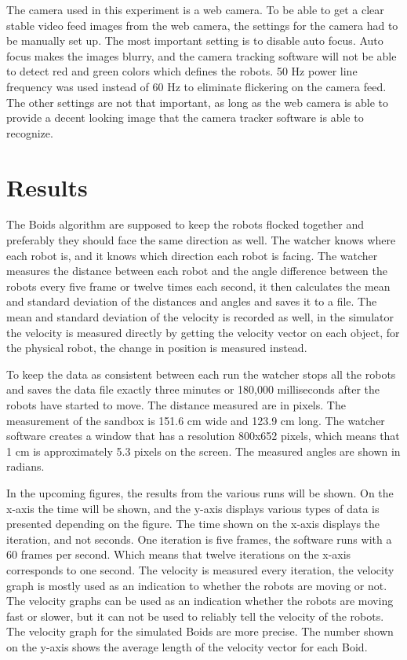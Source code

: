 The camera used in this experiment is a web camera. To be able to get a clear stable video feed images from the web camera, the settings for the camera had to be manually set up.
The most important setting is to disable auto focus. Auto focus makes the images blurry, and the camera tracking software will not be able to detect red and green colors which defines the robots. 50 Hz power line frequency was used instead of 60 Hz to eliminate flickering on the camera feed. The other settings are not that important, as long as the web camera is able to provide a decent looking image that the camera tracker software is able to recognize. 



\section{Results}
\label{sec:results}

The Boids algorithm are supposed to keep the robots flocked together and preferably they should face the same direction as well. The watcher knows where each robot is, and it knows which direction each robot is facing. The watcher measures the distance between each robot and the angle difference between the robots every five frame or twelve times each second, it then calculates the mean and standard deviation of the distances and angles and saves it to a file. The mean and standard deviation of the velocity is recorded as well, in the simulator the velocity is measured directly by getting the velocity vector on each object, for the physical robot, the change in position is measured instead.

To keep the data as consistent between each run the watcher stops all the robots and saves the data file exactly three minutes or 180,000 milliseconds after the robots have started to move.
The distance measured are in pixels. The measurement of the sandbox is 151.6 cm wide and 123.9 cm long. The watcher software creates a window that has a resolution 800x652 pixels, which means that 1 cm is approximately 5.3 pixels on the screen. The measured angles are shown in radians.

In the upcoming figures, the results from the various runs will be shown. On the x-axis the time will be shown, and the y-axis displays various types of data is presented depending on the figure. The time shown on the x-axis displays the iteration, and not seconds. One iteration is five frames, the software runs with a 60 frames per second. Which means that twelve iterations on the x-axis corresponds to one second. The velocity is measured every iteration, the velocity graph is mostly used as an indication to whether the robots are moving or not. The velocity graphs can be used as an indication whether the robots are moving fast or slower, but it can not be used to reliably tell the velocity of the robots. The velocity graph for the simulated Boids are more precise.
The number shown on the y-axis shows the average length of the velocity vector for each Boid.

